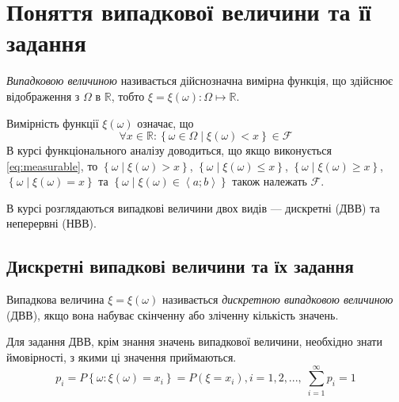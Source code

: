 
\section{Поняття випадкової величини та її задання}
\begin{definition}
    \emph{Випадковою величиною} називається дійснозначна вимірна функція, що здійснює 
    відображення з $\Omega$ в $\mathbb{R}$, тобто $\xi = \xi(\omega): \Omega 
    \mapsto \mathbb{R}$.
\end{definition}
\begin{remark}
    Вимірність функції $\xi(\omega)$ означає, що 
    \begin{equation}\label{eq:measurable}
        \forall x \in \mathbb{R}: 
        \left\{ \omega \in \Omega\; |\; \xi(\omega) < x\right\} \in \mathcal{F}
    \end{equation} В курсі 
    функціонального аналізу доводиться, що якщо виконується \eqref{eq:measurable}, то
    $\left\{ \omega \; |\; \xi(\omega) > x\right\}$, $\left\{ \omega \; |\; \xi(\omega) \leq x\right\}$,
    $\left\{ \omega \; |\; \xi(\omega) \geq x\right\}$, $\left\{ \omega \; |\; \xi(\omega) = x\right\}$ та
    $\left\{ \omega \; |\; \xi(\omega) \in \left< a; b\right> \right\}$ також належать $\mathcal{F}$.
\end{remark}

В курсі розглядаються випадкові величини двох видів --- дискретні (ДВВ) та неперервні (НВВ).

\subsection{Дискретні випадкові величини та їх задання}
\begin{definition}
    Випадкова величина $\xi = \xi(\omega)$ називається 
    \emph{дискретною випадковою величиною} (ДВВ), якщо вона набуває скінченну або зліченну 
    кількість значень.
\end{definition}
Для задання ДВВ, крім знання значень випадкової величини, необхідно знати ймовірності, 
з якими ці значення приймаються.
$$p_i = P\left\{\omega: \xi(\omega) = x_i\right\} = P(\xi = x_i), i = 1,2,... , \; \sum_{i=1}^\infty p_i = 1$$

